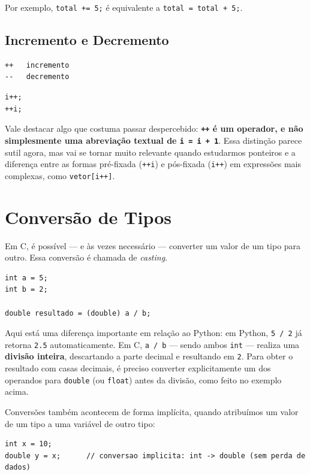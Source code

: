 Por exemplo, \texttt{total += 5;} é equivalente a \texttt{total = total + 5;}.

\subsection{Incremento e Decremento}
\begin{lstlisting}
++   incremento
--   decremento
\end{lstlisting}

\begin{lstlisting}
i++;
++i;
\end{lstlisting}

Vale destacar algo que costuma passar despercebido: \textbf{\texttt{++} é um operador, e não simplesmente uma abreviação textual de \texttt{i = i + 1}}. Essa distinção parece sutil agora, mas vai se tornar muito relevante quando estudarmos ponteiros e a diferença entre as formas pré-fixada (\texttt{++i}) e pós-fixada (\texttt{i++}) em expressões mais complexas, como \texttt{vetor[i++]}.

\section{Conversão de Tipos}
Em C, é possível — e às vezes necessário — converter um valor de um tipo para outro. Essa conversão é chamada de \textit{casting}.

\begin{lstlisting}
int a = 5;
int b = 2;

double resultado = (double) a / b;
\end{lstlisting}

Aqui está uma diferença importante em relação ao Python: em Python, \texttt{5 / 2} já retorna \texttt{2.5} automaticamente. Em C, \texttt{a / b} — sendo ambos \texttt{int} — realiza uma \textbf{divisão inteira}, descartando a parte decimal e resultando em \texttt{2}. Para obter o resultado com casas decimais, é preciso converter explicitamente um dos operandos para \texttt{double} (ou \texttt{float}) antes da divisão, como feito no exemplo acima.

Conversões também acontecem de forma implícita, quando atribuímos um valor de um tipo a uma variável de outro tipo:

\begin{lstlisting}
int x = 10;
double y = x;      // conversao implicita: int -> double (sem perda de dados)
\end{lstlisting}

